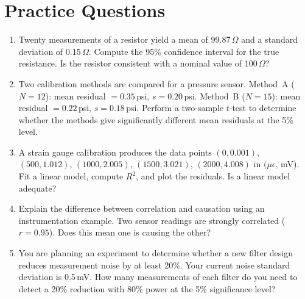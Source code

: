 \documentclass[11pt,letterpaper,twoside,openany]{book}
\begin{document}
\section{Practice Questions}
\begin{enumerate}[leftmargin=1.5em]
\item Twenty measurements of a resistor yield a mean of 99.87\,$\Omega$ and a standard deviation of 0.15\,$\Omega$. Compute the 95\% confidence interval for the true resistance. Is the resistor consistent with a nominal value of 100\,$\Omega$?
\item Two calibration methods are compared for a pressure sensor. Method~A ($N = 12$): mean residual $= 0.35$\,psi, $s = 0.20$\,psi. Method~B ($N = 15$): mean residual $= 0.22$\,psi, $s = 0.18$\,psi. Perform a two-sample $t$-test to determine whether the methods give significantly different mean residuals at the 5\% level.
\item A strain gauge calibration produces the data points $(0, 0.001)$, $(500, 1.012)$, $(1000, 2.005)$, $(1500, 3.021)$, $(2000, 4.008)$ in $(\mu\epsilon,\,$mV). Fit a linear model, compute $R^2$, and plot the residuals. Is a linear model adequate?
\item Explain the difference between correlation and causation using an instrumentation example. Two sensor readings are strongly correlated ($r = 0.95$). Does this mean one is causing the other?
\item You are planning an experiment to determine whether a new filter design reduces measurement noise by at least 20\%. Your current noise standard deviation is 0.5\,mV. How many measurements of each filter do you need to detect a 20\% reduction with 80\% power at the 5\% significance level?
\end{enumerate}
\end{document}
